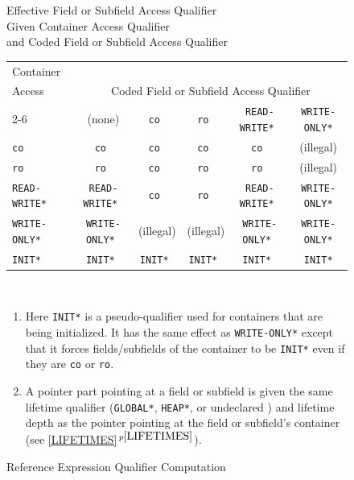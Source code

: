 \documentclass[12pt]{article}
\newcommand{\itemref}[1]{\ref{#1}$\,^{p\pageref{#1}}$}
\newlength{\figurewidth}
\newenvironment{boxedfigure}[1][!btp]%
	{\begin{figure}[#1]
	 \begin{lrbox}{\figurebox}
	 \begin{minipage}{\figurewidth}

	 \vspace*{1ex}}%
	{
	 \vspace*{1ex}

	 \end{minipage}
	 \end{lrbox}

	 \centering
	 \fbox{\hspace*{0.1in}\usebox{\figurebox}\hspace*{0.1in}}
	 \end{figure}}
\begin{document}
\begin{boxedfigure}[!t]
\newcommand{\tts}{\tt \small}
\begin{center}
Effective Field or Subfield Access Qualifier \\
Given Container Access Qualifier \\
and Coded Field or Subfield Access Qualifier
\\[1ex]
\begin{tabular}{|l|c|c|c|c|c|}
\multicolumn{1}{l}{Container}	\\
\multicolumn{1}{l}{Access}	&
	\multicolumn{5}{c}{Coded Field or Subfield Access Qualifier}
\\\cline{2-6}
\multicolumn{1}{l|}{Qualifier}
       & (none) & \tt co & \tt ro & \tts *READ-WRITE* & \tts *WRITE-ONLY*
\\\hline
\tt co & \tt co & \tt co & \tt co & \tt co & (illegal)
\\\hline
\tt ro & \tt ro & \tt co & \tt ro & \tt ro & (illegal)
\\\hline
\tts *READ-WRITE* & \tts *READ-WRITE* & \tt co & \tt ro & \tts *READ-WRITE*
		  & \tts *WRITE-ONLY*
\\\hline
\tts *WRITE-ONLY* & \tts *WRITE-ONLY* & (illegal) & (illegal)
                 & \tts *WRITE-ONLY* & \tts *WRITE-ONLY*
\\\hline
\tts *INIT* & \tts *INIT* & \tts *INIT* & \tts *INIT* & \tts *INIT*
            & \tts *INIT*
\\\hline
\end{tabular}
\\[1ex]
\begin{minipage}{6.0in}
\raggedright
\begin{enumerate}
\item Here\label{INIT-FORCING}
{\tt *INIT*} is a pseudo-qualifier used for containers
that are being initialized.  It has the same effect as {\tt *WRITE-ONLY*}
except that it forces fields/subfields of the container to be {\tt *INIT*}
even if they are {\tt co} or {\tt ro}.
\item A pointer part pointing at a field or subfield is
given the same lifetime qualifier
({\tt *GLOBAL*}, {\tt *HEAP*}, or undeclared )
and lifetime depth as the pointer pointing at the
field or subfield's container (see \itemref{LIFETIMES}).
\end{enumerate}
\end{minipage}
\end{center}

\caption{Reference Expression Qualifier Computation}
\label{REFERENCE-EXPRESSION-QUALIFIER-COMPUTATION}
\end{boxedfigure}
\end{document}
